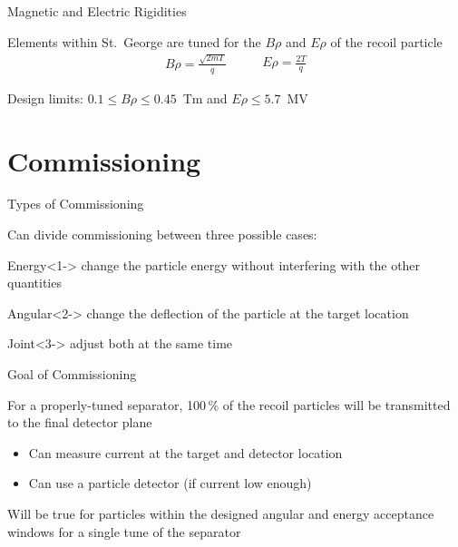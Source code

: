 \documentclass[10pt]{beamer}
\begin{document}
\begin{frame}[fragile]{Magnetic and Electric Rigidities}

    Elements within St.\ George are tuned for the $B\rho$ and $E\rho$ of
    the recoil particle
    \[
        \begin{split}
            B\rho = \frac{\sqrt{2mT}}{q}
        \end{split}
        \quad\quad
        \begin{split}
            E\rho = \frac{2T}{q}
        \end{split}
    \]

    Design limits: $0.1 \leq B\rho \leq 0.45$~Tm and $E\rho \leq 5.7$~MV

\end{frame}

\section{Commissioning}

\begin{frame}[fragile]{Types of Commissioning}

    Can divide commissioning between three possible cases:

    \begin{alertblock}{Energy}<1->%
        change the particle energy without interfering with the other
        quantities
    \end{alertblock}
    \begin{alertblock}{Angular}<2->
        change the deflection of the particle at the target location
    \end{alertblock}
    \begin{alertblock}{Joint}<3->
        adjust both at the same time
    \end{alertblock}

\end{frame}

\begin{frame}[fragile]{Goal of Commissioning}

    For a properly-tuned separator, 100\,\% of the recoil particles will
    be transmitted to the final detector plane
    \begin{itemize}
        \item Can measure current at the target and detector location
        \item Can use a particle detector (if current low enough)
    \end{itemize}

    Will be true for particles within the designed angular and energy
    acceptance windows for a single tune of the separator

\end{frame}
\end{document}
